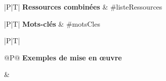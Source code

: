 \begin{tabular}[t]{|P|T|}
\hline
    \textcolor{saeC}{\bfseries Ressources combinées }
    &
    #listeRessources %
    \\
\hline
\end{tabular}


\begin{tabular}[t]{|P|T|}
\hline
    \textcolor{saeC}{\bfseries Mots-clés}
    &
    #motsCles %
    \\
\hline
\end{tabular}

\begin{tabular}[t]{|P|T|}
\hline
        \begin{tabular}[t]{@{}P@{}}
        \bfseries \textcolor{saeC}{Exemples de} \tabularnewline
        \bfseries \textcolor{saeC}{mise en \oe{}uvre}
    \end{tabular}
    &
    \\
\hline
\end{tabular}
